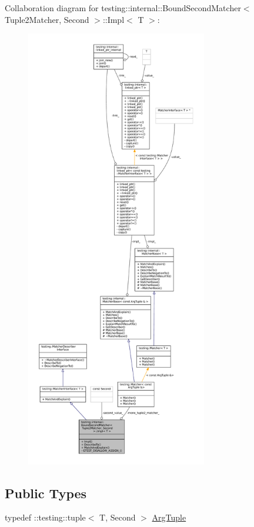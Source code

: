 Collaboration diagram for testing\+:\+:internal\+:\+:Bound\+Second\+Matcher$<$ Tuple2\+Matcher, Second $>$\+:\+:Impl$<$ T $>$\+:
\nopagebreak
\begin{figure}[H]
\begin{center}
\leavevmode
\includegraphics[height=550pt]{classtesting_1_1internal_1_1BoundSecondMatcher_1_1Impl__coll__graph}
\end{center}
\end{figure}
\subsection*{Public Types}
\begin{DoxyCompactItemize}
\item 
typedef \+::testing\+::tuple$<$ T, Second $>$ \hyperlink{classtesting_1_1internal_1_1BoundSecondMatcher_1_1Impl_acf41615a5de6421fc89fd38118fc6384}{Arg\+Tuple}
\end{DoxyCompactItemize}
